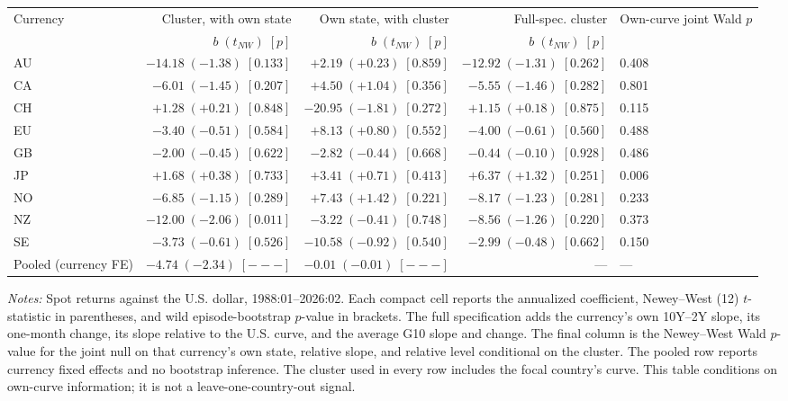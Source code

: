 \begin{table}[H]
\vspace{0.7em}
\begin{tabular}{lrrrl}
\toprule
Currency & Cluster, with own state & Own state, with cluster & Full-spec. cluster & Own-curve joint Wald $p$ \\
& $b\;(t_{NW})\;[p]$ & $b\;(t_{NW})\;[p]$ & $b\;(t_{NW})\;[p]$ & \\
\midrule
AU & $-14.18\;(-1.38)\;[0.133]$ & $+2.19\;(+0.23)\;[0.859]$ & $-12.92\;(-1.31)\;[0.262]$ & 0.408 \\
CA & $-6.01\;(-1.45)\;[0.207]$ & $+4.50\;(+1.04)\;[0.356]$ & $-5.55\;(-1.46)\;[0.282]$ & 0.801 \\
CH & $+1.28\;(+0.21)\;[0.848]$ & $-20.95\;(-1.81)\;[0.272]$ & $+1.15\;(+0.18)\;[0.875]$ & 0.115 \\
EU & $-3.40\;(-0.51)\;[0.584]$ & $+8.13\;(+0.80)\;[0.552]$ & $-4.00\;(-0.61)\;[0.560]$ & 0.488 \\
GB & $-2.00\;(-0.45)\;[0.622]$ & $-2.82\;(-0.44)\;[0.668]$ & $-0.44\;(-0.10)\;[0.928]$ & 0.486 \\
JP & $+1.68\;(+0.38)\;[0.733]$ & $+3.41\;(+0.71)\;[0.413]$ & $+6.37\;(+1.32)\;[0.251]$ & 0.006 \\
NO & $-6.85\;(-1.15)\;[0.289]$ & $+7.43\;(+1.42)\;[0.221]$ & $-8.17\;(-1.23)\;[0.281]$ & 0.233 \\
NZ & $-12.00\;(-2.06)\;[0.011]$ & $-3.22\;(-0.41)\;[0.748]$ & $-8.56\;(-1.26)\;[0.220]$ & 0.373 \\
SE & $-3.73\;(-0.61)\;[0.526]$ & $-10.58\;(-0.92)\;[0.540]$ & $-2.99\;(-0.48)\;[0.662]$ & 0.150 \\
Pooled (currency FE) & $-4.74\;(-2.34)\;[---]$ & $-0.01\;(-0.01)\;[---]$ & --- & --- \\
\bottomrule
\end{tabular}

\begin{minipage}{0.97\textwidth}
\footnotesize\emph{Notes:} Spot returns against the U.S. dollar, 1988:01--2026:02. Each compact cell reports the annualized coefficient, Newey--West (12) $t$-statistic in parentheses, and wild episode-bootstrap $p$-value in brackets. The full specification adds the currency's own 10Y--2Y slope, its one-month change, its slope relative to the U.S. curve, and the average G10 slope and change. The final column is the Newey--West Wald $p$-value for the joint null on that currency's own state, relative slope, and relative level conditional on the cluster. The pooled row reports currency fixed effects and no bootstrap inference. The cluster used in every row includes the focal country's curve. This table conditions on own-curve information; it is not a leave-one-country-out signal.
\end{minipage}
\end{table}
